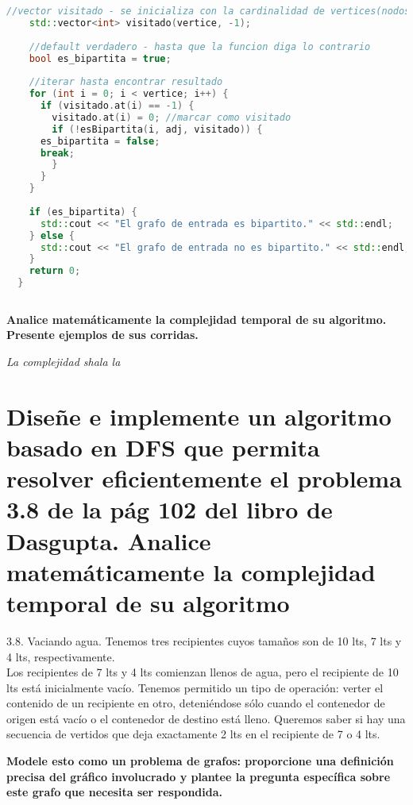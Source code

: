 \documentclass{article}
\begin{document}
\begin{file}
\begin{lstlisting}[language=C++]
    //vector visitado - se inicializa con la cardinalidad de vertices(nodos) y todos en -1
    std::vector<int> visitado(vertice, -1);
    
    //default verdadero - hasta que la funcion diga lo contrario
    bool es_bipartita = true;
    
    //iterar hasta encontrar resultado
    for (int i = 0; i < vertice; i++) {
      if (visitado.at(i) == -1) {
        visitado.at(i) = 0; //marcar como visitado
        if (!esBipartita(i, adj, visitado)) {
	  es_bipartita = false;
	  break;
        }
      }
    }
    
    if (es_bipartita) {
      std::cout << "El grafo de entrada es bipartito." << std::endl;
    } else {
      std::cout << "El grafo de entrada no es bipartito." << std::endl;
    }
    return 0;
  }
  
\end{lstlisting}
\end{file}

\newpage
\begin{question}
  \textbf{Analice matemáticamente la complejidad temporal de su algoritmo. Presente ejemplos de sus corridas.}
\end{question}
\textit{La complejidad shala la}


\newpage
\section{Diseñe e implemente un algoritmo basado en DFS que permita resolver eficientemente el problema 3.8 de la pág 102 del libro de Dasgupta. Analice matemáticamente la complejidad temporal de su algoritmo}

3.8. Vaciando agua. Tenemos tres recipientes cuyos tamaños son de 10 lts, 7 lts y 4 lts, respectivamente.\\
Los recipientes de 7 lts y 4 lts comienzan llenos de agua, pero el recipiente de 10 lts está inicialmente vacío. Tenemos permitido un tipo de operación: verter el contenido de un recipiente en otro, deteniéndose sólo cuando el contenedor de origen está vacío o el contenedor de destino está lleno. Queremos saber si hay una secuencia de vertidos que deja exactamente 2 lts en el recipiente de 7 o 4 lts.

\begin{question}
  \textbf{Modele esto como un problema de grafos: proporcione una definición precisa del gráfico involucrado y plantee la pregunta específica sobre este grafo que necesita ser respondida.}\\
\end{question}
\end{document}
